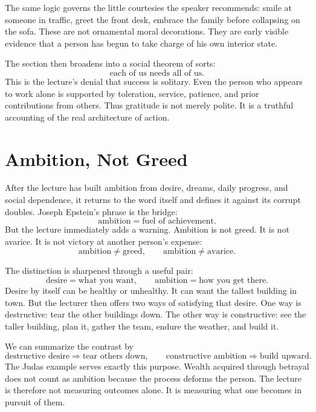 The same logic governs the little courtesies the speaker recommends: smile at someone in traffic, greet the front desk, embrace the family before collapsing on the sofa. These are not ornamental moral decorations. They are early visible evidence that a person has begun to take charge of his own interior state.

The section then broadens into a social theorem of sorts:
\begin{equation}
\text{each of us needs all of us}.
\end{equation}
This is the lecture's denial that success is solitary. Even the person who appears to work alone is supported by toleration, service, patience, and prior contributions from others. Thus gratitude is not merely polite. It is a truthful accounting of the real architecture of action.

\section{Ambition, Not Greed}

After the lecture has built ambition from desire, dreams, daily progress, and social dependence, it returns to the word itself and defines it against its corrupt doubles. Joseph Epstein's phrase is the bridge:
\begin{equation}
\text{ambition}=\text{fuel of achievement}.
\end{equation}
But the lecture immediately adds a warning. Ambition is not greed. It is not avarice. It is not victory at another person's expense:
\begin{equation}
\text{ambition}\neq \text{greed},
\qquad
\text{ambition}\neq \text{avarice}.
\end{equation}

The distinction is sharpened through a useful pair:
\begin{equation}
\text{desire}=\text{what you want},
\qquad
\text{ambition}=\text{how you get there}.
\end{equation}
Desire by itself can be healthy or unhealthy. It can want the tallest building in town. But the lecturer then offers two ways of satisfying that desire. One way is destructive: tear the other buildings down. The other way is constructive: see the taller building, plan it, gather the team, endure the weather, and build it.

We can summarize the contrast by
\begin{equation}
\text{destructive desire}\Rightarrow \text{tear others down},
\qquad
\text{constructive ambition}\Rightarrow \text{build upward}.
\end{equation}
The Judas example serves exactly this purpose. Wealth acquired through betrayal does not count as ambition because the process deforms the person. The lecture is therefore not measuring outcomes alone. It is measuring what one becomes in pursuit of them.

